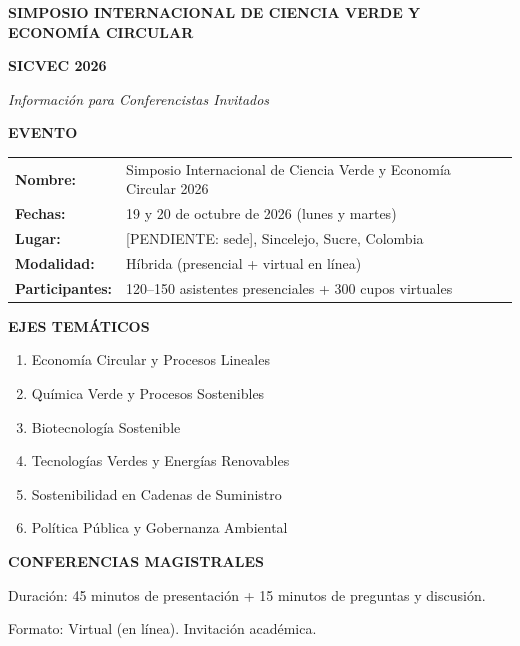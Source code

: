 \documentclass[11pt,a4paper]{article}
\begin{document}
\vspace{0.3cm}

\begin{center}
\textbf{\Large SIMPOSIO INTERNACIONAL DE CIENCIA VERDE Y ECONOMÍA CIRCULAR}

\textbf{\large SICVEC 2026}

\textit{Información para Conferencistas Invitados}
\end{center}

\vspace{0.3cm}

\noindent
\textbf{EVENTO}

\begin{tabular}{ll}
\textbf{Nombre:} & Simposio Internacional de Ciencia Verde y Economía Circular 2026 \\
\textbf{Fechas:} & 19 y 20 de octubre de 2026 (lunes y martes) \\
\textbf{Lugar:} & [PENDIENTE: sede], Sincelejo, Sucre, Colombia \\
\textbf{Modalidad:} & Híbrida (presencial + virtual en línea) \\
\textbf{Participantes:} & 120–150 asistentes presenciales + 300 cupos virtuales \\
\end{tabular}

\vspace{0.3cm}

\noindent
\textbf{EJES TEMÁTICOS}

\begin{enumerate}\setlength{\itemsep}{0.15cm}
\item Economía Circular y Procesos Lineales
\item Química Verde y Procesos Sostenibles
\item Biotecnología Sostenible
\item Tecnologías Verdes y Energías Renovables
\item Sostenibilidad en Cadenas de Suministro
\item Política Pública y Gobernanza Ambiental
\end{enumerate}

\vspace{0.2cm}

\noindent
\textbf{CONFERENCIAS MAGISTRALES}

Duración: 45 minutos de presentación + 15 minutos de preguntas y discusión.

Formato: Virtual (en línea). Invitación académica.
\end{document}
